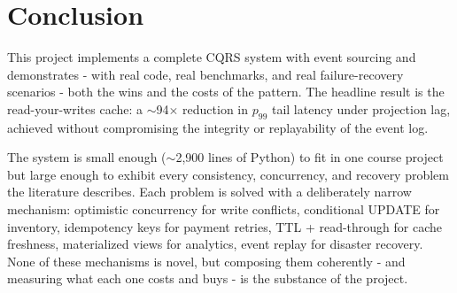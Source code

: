 \documentclass[11pt,a4paper]{article}
\begin{document}
\section{Conclusion}

This project implements a complete CQRS system with event sourcing and demonstrates - with real code, real benchmarks, and real failure-recovery scenarios - both the wins and the costs of the pattern. The headline result is the read-your-writes cache: a $\sim$94$\times$ reduction in $p_{99}$ tail latency under projection lag, achieved without compromising the integrity or replayability of the event log.

The system is small enough ($\sim$2{,}900 lines of Python) to fit in one course project but large enough to exhibit every consistency, concurrency, and recovery problem the literature describes. Each problem is solved with a deliberately narrow mechanism: optimistic concurrency for write conflicts, conditional UPDATE for inventory, idempotency keys for payment retries, TTL + read-through for cache freshness, materialized views for analytics, event replay for disaster recovery. None of these mechanisms is novel, but composing them coherently - and measuring what each one costs and buys - is the substance of the project.

\end{document}

